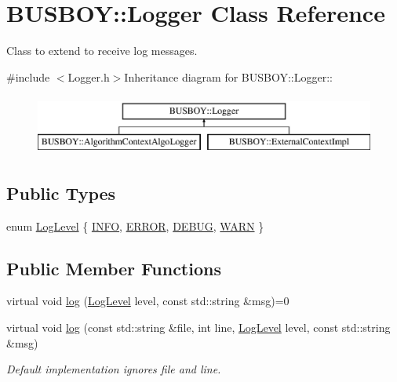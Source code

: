 \hypertarget{classBUSBOY_1_1Logger}{
\section{BUSBOY::Logger Class Reference}
\label{classBUSBOY_1_1Logger}
}


Class to extend to receive log messages.  


{\ttfamily \#include $<$Logger.h$>$}Inheritance diagram for BUSBOY::Logger::\begin{figure}[H]
\begin{center}
\leavevmode
\includegraphics[height=2cm]{classBUSBOY_1_1Logger}
\end{center}
\end{figure}
\subsection*{Public Types}
\begin{DoxyCompactItemize}
\item 
enum \hyperlink{classBUSBOY_1_1Logger_ac674cbb789eaa29c338c66248a4e4234}{LogLevel} \{ \hyperlink{classBUSBOY_1_1Logger_ac674cbb789eaa29c338c66248a4e4234ac90a02d050adf093af6a242f938164d5}{INFO}, 
\hyperlink{classBUSBOY_1_1Logger_ac674cbb789eaa29c338c66248a4e4234a74c72bebd739b177544a020dbfdd42f2}{ERROR}, 
\hyperlink{classBUSBOY_1_1Logger_ac674cbb789eaa29c338c66248a4e4234a157cb4f1645f3f312daea39a2a40585c}{DEBUG}, 
\hyperlink{classBUSBOY_1_1Logger_ac674cbb789eaa29c338c66248a4e4234a41261b8124e4372fc1f9cfbf3d97dee1}{WARN}
 \}
\end{DoxyCompactItemize}
\subsection*{Public Member Functions}
\begin{DoxyCompactItemize}
\item 
virtual void \hyperlink{classBUSBOY_1_1Logger_ad07e2e8263d8bfb1e702e0548e502957}{log} (\hyperlink{classBUSBOY_1_1Logger_ac674cbb789eaa29c338c66248a4e4234}{LogLevel} level, const std::string \&msg)=0
\item 
virtual void \hyperlink{classBUSBOY_1_1Logger_a7eec0eff91908006defd671e915ee221}{log} (const std::string \&file, int line, \hyperlink{classBUSBOY_1_1Logger_ac674cbb789eaa29c338c66248a4e4234}{LogLevel} level, const std::string \&msg)
\begin{DoxyCompactList}\small\item\em Default implementation ignores file and line. \item\end{DoxyCompactList}\end{DoxyCompactItemize}
